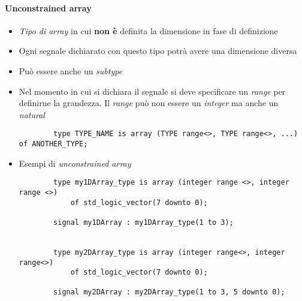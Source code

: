 \documentclass{article}
\begin{document}
\paragraph{Unconstrained array}
\begin{itemize}
	\item \textit{Tipo di array} in cui \textbf{non è} definita la dimensione in fase di definizione
	\item Ogni segnale dichiarato con questo tipo potrà avere una dimensione diversa
	\item Può essere anche un \textit{subtype}
	\item Nel momento in cui si dichiara il segnale si deve specificare un \textit{range} per definirne la grandezza. Il \textit{range} può non essere un \textit{integer} ma anche un \textit{natural}
	\begin{verbatim}
	    type TYPE_NAME is array (TYPE range<>, TYPE range<>, ...) of ANOTHER_TYPE;
	\end{verbatim}
	\item Esempi di \textit{unconstrained array}
	\begin{verbatim}
	    type my1DArray_type is array (integer range <>, integer range <>) 
	        of std_logic_vector(7 downto 0);
	        
	    signal my1DArray : my1DArray_type(1 to 3);
		
		
	    type my2DArray_type is array (integer range<>, integer range<>) 
    	    of std_logic_vector(7 downto 0);
    	    
	    signal my2DArray : my2DArray_type(1 to 3, 5 downto 0);
	\end{verbatim}
\end{itemize}
\end{document}
